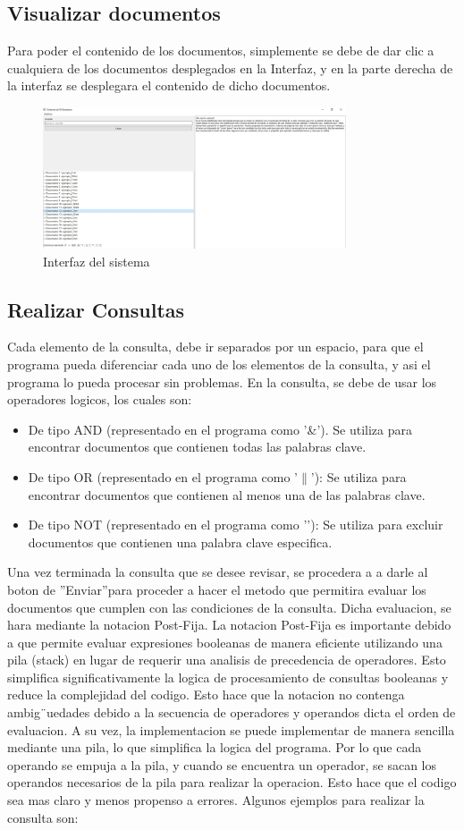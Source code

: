 \subsection{Visualizar documentos}
Para poder el contenido de los documentos, simplemente se debe de dar clic a cualquiera de los documentos
desplegados en la Interfaz, y en la parte derecha de la interfaz se desplegara el contenido de dicho
documentos.
\begin{figure}[ht]
  \centering
  \includegraphics[width=0.8\textwidth]{src/img/ejecucion/3.jpg}
  \caption{Interfaz del sistema}
\end{figure}
\subsection{Realizar Consultas}
Cada elemento de la consulta, debe ir separados por un espacio, para que el programa pueda diferenciar
cada uno de los elementos de la consulta, y asi el programa lo pueda procesar sin problemas. En la consulta,
se debe de usar los operadores logicos, los cuales son:
\begin{itemize}
  \item De tipo AND (representado en el programa como ’\&'). Se utiliza para encontrar documentos que
        contienen todas las palabras clave.
  \item De tipo OR (representado en el programa como ’$\|$’): Se utiliza para encontrar documentos que contienen
        al menos una de las palabras clave.
  \item De tipo NOT (representado en el programa como ’\!’): Se utiliza para excluir documentos que contienen
        una palabra clave especifica.
\end{itemize}
Una vez terminada la consulta que se desee revisar, se procedera a a darle al boton de ”Enviar”para
proceder a hacer el metodo que permitira evaluar los documentos que cumplen con las condiciones de la
consulta. Dicha evaluacion, se hara mediante la notacion Post-Fija.
La notacion Post-Fija es importante debido a que permite evaluar expresiones booleanas de manera
eficiente utilizando una pila (stack) en lugar de requerir una analisis de precedencia de operadores. Esto
simplifica significativamente la logica de procesamiento de consultas booleanas y reduce la complejidad
del codigo. Esto hace que la notacion no contenga ambig¨uedades debido a la secuencia de operadores y
operandos dicta el orden de evaluacion. A su vez, la implementacion se puede implementar de manera
sencilla mediante una pila, lo que simplifica la logica del programa. Por lo que cada operando se empuja
a la pila, y cuando se encuentra un operador, se sacan los operandos necesarios de la pila para realizar
la operacion. Esto hace que el codigo sea mas claro y menos propenso a errores. Algunos ejemplos para
realizar la consulta son:
